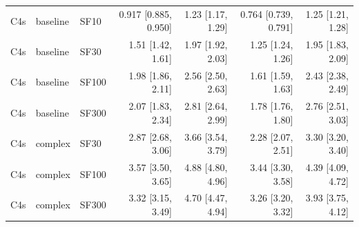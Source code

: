 \begin{longtable}{lllrrrr}
C4s & baseline & SF10 & 0.917 [0.885, 0.950] & 1.23 [1.17, 1.29] & 0.764 [0.739, 0.791] & 1.25 [1.21, 1.28] \\
C4s & baseline & SF30 & 1.51 [1.42, 1.61] & 1.97 [1.92, 2.03] & 1.25 [1.24, 1.26] & 1.95 [1.83, 2.09] \\
C4s & baseline & SF100 & 1.98 [1.86, 2.11] & 2.56 [2.50, 2.63] & 1.61 [1.59, 1.63] & 2.43 [2.38, 2.49] \\
C4s & baseline & SF300 & 2.07 [1.83, 2.34] & 2.81 [2.64, 2.99] & 1.78 [1.76, 1.80] & 2.76 [2.51, 3.03] \\
C4s & complex & SF30 & 2.87 [2.68, 3.06] & 3.66 [3.54, 3.79] & 2.28 [2.07, 2.51] & 3.30 [3.20, 3.40] \\
C4s & complex & SF100 & 3.57 [3.50, 3.65] & 4.88 [4.80, 4.96] & 3.44 [3.30, 3.58] & 4.39 [4.09, 4.72] \\
C4s & complex & SF300 & 3.32 [3.15, 3.49] & 4.70 [4.47, 4.94] & 3.26 [3.20, 3.32] & 3.93 [3.75, 4.12] \\
\end{longtable}
